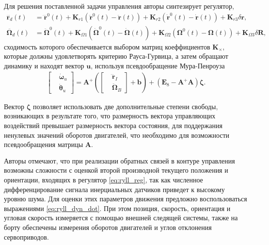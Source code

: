 Для решения поставленной задачи управления авторы синтезирует регулятор,
\begin{equation} \label{eq:ryll_reg}
\begin{aligned}
\dddot{\bm{r}_d}(t)&=
\dddot{\bm{r}}^0(t) +
\bm{K}_{r1}(\ddot{\bm{r}}^0(t) - \ddot{\bm{r}}(t)) +
\bm{K}_{r2}(\dot{\bm{r}}^0(t) - \dot{\bm{r}}(t)) + 
\bm{K}_{r3}\delta \bm r,
\\
\ddot{\bm{\Omega}_d}(t)&=
\ddot{\bm{\Omega}}^0(t)
+ \bm{K}_{\Omega1}(\dot{\bm{\Omega}}^0(t)-\dot{\bm{\Omega}}(t))
+ \bm{K}_{\Omega2}(\bm{\Omega}^0(t)-\bm{\Omega}(t))
+ \bm{K}_{\Omega3}\delta\bm{R},
\end{aligned}
\end{equation}
сходимость которого обеспечивается выбором матриц коеффициентов $\bm K_{\times}$, которые должны удовлетворять критерию Рауса-Гурвица, а затем обращают динамику и находят вектор $\bm u$, используя псевдообращение Мура-Пенроуза \cite{Barata01}
\begin{equation} \label{eq:ryll_inversed}
\begin{aligned}
\begin{bmatrix}
&\dot{\bm \omega}_u
\\
&\dot{\bm \theta}_u
\end{bmatrix}
=
\bm A^+ \left(
\begin{bmatrix}
&\dddot{\bm r}_I
\\
&\ddot{\bm \Omega}_B
\end{bmatrix}
+
\bm b
\right)
+
(\bm E_8 - \bm A^+ \bm A) \bm \zeta.
\end{aligned}
\end{equation}

Вектор $\bm \zeta$ позволяет использовать две дополнительные степени свободы, возникающих в результате того, что размерность вектора управляющих воздействий превышает размерность вектора состояния, для поддержания ненулевых значений оборотов двигателей, что необходимо для возможности псевдообращения матрицы $\bm A$.

Авторы отмечают, что при реализации обратных связей в контуре управления возможны сложности
с оценкой второй производной текущего положения и ориентации, входящих в регулятор \eqref{eq:ryll_reg},
так как численное дифференцирование сигнала инерциальных датчиков приведет к высокому уровню шума.
Для оценки этих параметров движения предложно воспользоваться выражениями \eqref{eq:ryll_dyn_dot}.
При этом позиция, скорость, ориентация и угловая скорость
измеряется с помощью внешней следящей системы,
также на борту обеспечены измерения оборотов двигателей и углов отклонения сервоприводов.


